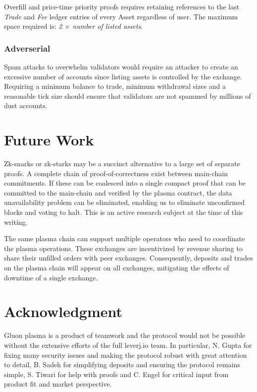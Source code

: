 \documentclass[12pt,a4paper]{article}
\begin{document}
Overfill and price-time priority proofs requires retaining references to the last \emph{Trade} and \emph{Fee} ledger entries of every Asset regardless of user. The maximum space required is: \emph{2 $\times$ number of listed assets}.

\subsubsection{Adverserial} Spam attacks to overwhelm validators would require an attacker to create an excessive number of accounts since listing assets is controlled by the exchange. Requiring a minimum balance to trade, minimum withdrawal sizes and a reasonable tick size should ensure that validators are not spammed by millions of dust accounts. 

\section*{Future Work}
Zk-snarks or zk-starks may be a succinct alternative to a large set of separate proofs. A complete chain of proof-of-correctness exist between main-chain commitments. If these can be coalesced into a single compact proof that can be committed to the main-chain and verified by the plasma contract, the data unavailability problem can be eliminated, enabling us to eliminate unconfirmed blocks and voting to halt. This is an active research subject at the time of this writing.

The same plasma chain can support multiple operators who need to coordinate the plasma operations. These exchanges are incentivized by revenue sharing to share their unfilled orders with peer exchanges. Consequently, deposits and trades on the plasma chain will appear on all exchanges, mitigating the effects of downtime of a single exchange.

\section*{Acknowledgment}
Gluon plasma is a product of teamwork and the protocol would not be possible without the extensive efforts of the full leverj.io team. In particular, N. Gupta for fixing many security issues and making the protocol robust with great attention to detail, B. Sadeh for simplifying deposits and ensuring the protocol remains simple, S. Tiwari for help with proofs and C. Engel for critical input from product fit and market perspective.
\end{document}
